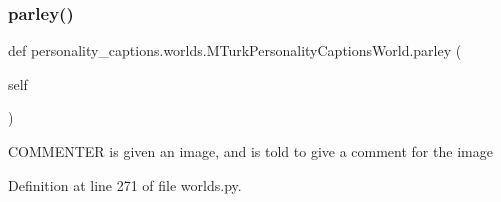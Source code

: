 \subsubsection{\texorpdfstring{parley()}{parley()}}
{\footnotesize\ttfamily def personality\+\_\+captions.\+worlds.\+M\+Turk\+Personality\+Captions\+World.\+parley (\begin{DoxyParamCaption}\item[{}]{self }\end{DoxyParamCaption})}

\begin{DoxyVerb}    COMMENTER is given an image, and is told to give a comment for
    the image
\end{DoxyVerb}
 

Definition at line 271 of file worlds.\+py.



